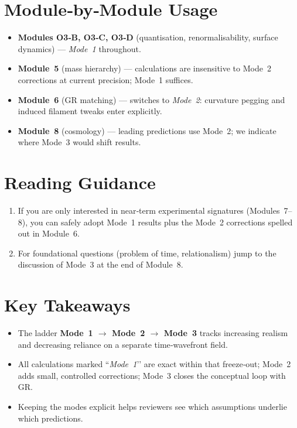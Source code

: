 \documentclass[12pt]{article}
\begin{document}
\section*{Module‑by‑Module Usage}
\begin{itemize}
  \item \textbf{Modules O3‑B, O3‑C, O3‑D} (quantisation, renormalisability, surface dynamics) --- \emph{Mode 1} throughout.
  \item \textbf{Module 5} (mass hierarchy) --- calculations are insensitive to Mode 2 corrections at current precision; Mode 1 suffices.
  \item \textbf{Module 6} (GR matching) --- switches to \emph{Mode 2}: curvature pegging and induced filament tweaks enter explicitly.
  \item \textbf{Module 8} (cosmology) --- leading predictions use Mode 2; we indicate where Mode 3 would shift results.
\end{itemize}

\section*{Reading Guidance}
\begin{enumerate}
  \item If you are only interested in near‑term experimental signatures (Modules 7–8), you can safely adopt Mode 1 results plus the Mode 2 corrections spelled out in Module 6.
  \item For foundational questions (problem of time, relationalism) jump to the discussion of Mode 3 at the end of Module 8.
\end{enumerate}

\section*{Key Takeaways}
\begin{itemize}
  \item The ladder \textbf{Mode 1 $\to$ Mode 2 $\to$ Mode 3} tracks increasing realism and decreasing reliance on a separate time‑wavefront field.
  \item All calculations marked ``\emph{Mode 1}’’ are exact within that freeze‑out; Mode 2 adds small, controlled corrections; Mode 3 closes the conceptual loop with GR.
  \item Keeping the modes explicit helps reviewers see which assumptions underlie which predictions.
\end{itemize}
\end{document}
